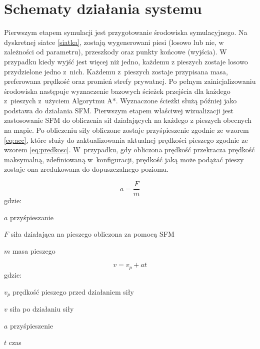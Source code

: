 \chapter{Schematy działania systemu}
\label{cha:schematy}

Pierwszym etapem symulacji jest przygotowanie środowiska symulacyjnego. Na dyskretnej siatce \ref{siatka}, zostają wygenerowani piesi (losowo lub nie, w zależności od parametru), przeszkody oraz punkty końcowe (wyjścia). W przypadku kiedy wyjść jest więcej niż jedno, każdemu z pieszych zostaje losowo przydzielone jedno z~nich. Każdemu z~pieszych zostaje przypisana masa, preferowana prędkość oraz promień strefy prywatnej.
Po pełnym zainicjalizowaniu środowiska następuje wyznaczenie bazowych ścieżek przejścia dla każdego z~pieszych z~użyciem Algorytmu A*. Wyznaczone ścieżki służą później jako podstawa do działania SFM.
Pierwszym etapem właściwej wizualizacji jest zastosowanie SFM do obliczenia sił działających na każdego z pieszych obecnych na mapie. Po obliczeniu siły obliczone zostaje przyśpieszenie zgodnie ze wzorem \ref{eq:acc}, które służy do zaktualizowania aktualnej prędkości pieszego zgodnie ze wzorem \ref{eq:predkosc}. W~przypadku, gdy obliczona prędkość przekracza prędkość maksymalną, zdefiniowaną w~konfiguracji, prędkość jaką może podążać pieszy zostaje ona zredukowana do dopuszczalnego poziomu. 

\begin{equation}
\label{eq:acc}
a = \frac{F}{m}
\end{equation}
gdzie:
\begin{eqwhere}[2cm]
	\item[$a$] przyśpieszanie
	\item[$F$] siła działająca na pieszego obliczona za pomocą SFM
	\item[$m$] masa pieszego
\end{eqwhere}

\begin{samepage}
\begin{equation}
\label{eq:predkosc}
v = v_{p} + at
\end{equation}
gdzie:
\begin{eqwhere}[2cm]
	\item[$v_{p}$] prędkość pieszego przed działaniem siły
	\item[$v$] siła po działaniu siły
	\item[$a$] przyśpieszenie
	\item[$t$] czas
\end{eqwhere}
\end{samepage}

